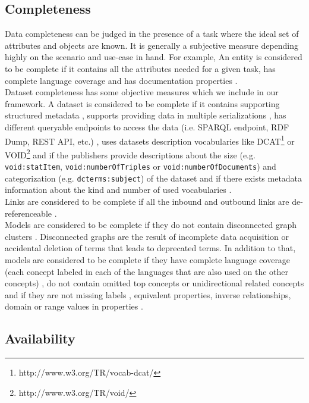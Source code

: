 \documentclass[onecolumn, crcready]{iosart2c}
\begin{document}
 \subsection{Completeness}

Data completeness can be judged in the presence of a task where the ideal set of attributes and objects are known. It is generally a subjective measure depending highly on the scenario and use-case in hand. For example, An entity is considered to be complete if it contains all the attributes needed for a given task, has complete language coverage \cite{Mader2012} and has documentation properties \cite{w3c_skos_rec}\cite{Mader2012}.\\
Dataset completeness has some objective measures which we include in our framework. A dataset is considered to be complete if it contains supporting structured metadata \cite{Hogan2010}, supports providing data in multiple serializations \cite{Framework2012}, has different queryable endpoints to access the data (i.e. SPARQL endpoint, RDF Dump, REST API, etc.) \cite{Framework2012}, uses datasets description vocabularies like DCAT\footnote{http://www.w3.org/TR/vocab-dcat/} or VOID\footnote{http://www.w3.org/TR/void/} and if the publishers provide descriptions about the size (e.g. \texttt{void:statItem}, \texttt{void:numberOfTriples} or \texttt{void:numberOfDocuments}) and categorization (e.g. \texttt{dcterms:subject}) of the dataset and if there exists metadata information about the kind and number of used vocabularies \cite{Framework2012}.\\
Links are considered to be complete if all the inbound and outbound links are de-referenceable \cite{Hogan2010}\cite{Mader2012}\cite{Gueret2012}.\\
Models are considered to be complete if they do not contain disconnected graph clusters \cite{Mader2012}. Disconnected graphs are the result of incomplete data acquisition or accidental deletion of terms that leads to deprecated terms. In addition to that, models are considered to be complete if they have complete language coverage (each concept labeled in each of the languages that are also used on the other concepts) \cite{Mader2012}, do not contain omitted top concepts or unidirectional related concepts \cite{Hogan2010} and if they are not missing labels \cite{Mader2012}, equivalent properties, inverse relationships, domain or range values in properties \cite{DBLP:conf/ic3k/KeetSP13}.

\subsection{Availability}
\end{document}

